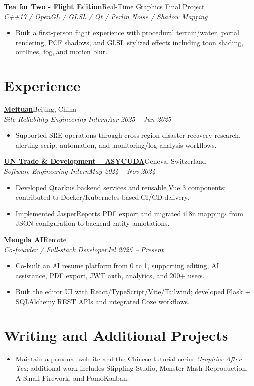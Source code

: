\documentclass[10pt]{article}
\newcommand{\entry}[4]{\textbf{#1}\hfill #2\\\textit{#3}\hfill\textit{#4}\vspace{0.07em}}
\newcommand{\project}[3]{\vspace{0.18em}\textbf{#1}\hfill #2\\\textit{#3}\vspace{0.04em}}
\begin{document}
\project{Tea for Two - Flight Edition}{Real-Time Graphics Final Project}{C++17 / OpenGL / GLSL / Qt / Perlin Noise / Shadow Mapping}
\begin{itemize}
  \item Built a first-person flight experience with procedural terrain/water, portal rendering, PCF shadows, and GLSL stylized effects including toon shading, outlines, fog, and motion blur.
\end{itemize}

\section*{Experience}
\entry{\href{https://www.meituan.com/}{Meituan}}{Beijing, China}{Site Reliability Engineering Intern}{Apr 2025 -- Jun 2025}
\begin{itemize}
  \item Supported SRE operations through cross-region disaster-recovery research, alerting-script automation, and monitoring/log-analysis workflows.
\end{itemize}

\entry{\href{https://asycuda.org/en/}{UN Trade \& Development -- ASYCUDA}}{Geneva, Switzerland}{Software Engineering Intern}{May 2024 -- Nov 2024}
\begin{itemize}
  \item Developed Quarkus backend services and reusable Vue 3 components; contributed to Docker/Kubernetes-based CI/CD delivery.
  \item Implemented JasperReports PDF export and migrated i18n mappings from JSON configuration to backend entity annotations.
\end{itemize}

\entry{\href{http://mengdaai.com/}{Mengda AI}}{Remote}{Co-founder / Full-stack Developer}{Jul 2025 -- Present}
\begin{itemize}
  \item Co-built an AI resume platform from 0 to 1, supporting editing, AI assistance, PDF export, JWT auth, analytics, and 200+ users.
  \item Built the editor UI with React/TypeScript/Vite/Tailwind; developed Flask + SQLAlchemy REST APIs and integrated Coze workflows.
\end{itemize}

\section*{Writing and Additional Projects}
\begin{itemize}
  \item Maintain a personal website and the Chinese tutorial series \textit{Graphics After Tea}; additional work includes Stippling Studio, Monster Mash Reproduction, A Small Firework, and PomoKanban.
\end{itemize}
\end{document}
